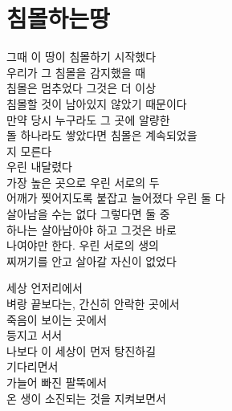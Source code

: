\hypertarget{uxce68uxbab0uxd558uxb294uxb545}{%

\section{침몰하는땅}\label{uxce68uxbab0uxd558uxb294uxb545}}



그때 이 땅이 침몰하기 시작했다\\

우리가 그 침몰을 감지했을 때\\

침몰은 멈추었다 그것은 더 이상\\

침몰할 것이 남아있지 않았기 때문이다\\

만약 당시 누구라도 그 곳에 알량한\\

돌 하나라도 쌓았다면 침몰은 계속되었을\\

지 모른다\\

우린 내달렸다\\

가장 높은 곳으로 우린 서로의 두\\

어깨가 찢어지도록 붙잡고 늘어졌다 우린 둘 다\\

살아남을 수는 없다 그렇다면 둘 중\\

하나는 살아남아야 하고 그것은 바로\\

나여야만 한다. 우린 서로의 생의\\

찌꺼기를 안고 살아갈 자신이 없었다



세상 언저리에서\\

벼랑 끝보다는, 간신히 안락한 곳에서\\

죽음이 보이는 곳에서\\

등지고 서서\\

나보다 이 세상이 먼저 탕진하길\\

기다리면서\\

가늘어 빠진 팔뚝에서\\

온 생이 소진되는 것을 지켜보면서

